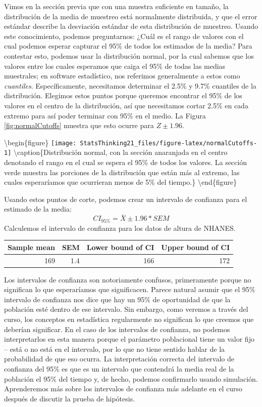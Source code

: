 \documentclass[
  12pt,
]{book}
\theoremstyle{definition}
\theoremstyle{definition}
\theoremstyle{definition}
\theoremstyle{remark}
\begin{document}
Vimos en la sección previa que con una muestra suficiente en tamaño, la distribución de la media de muestreo está normalmente distribuida, y que el error estándar describe la desviación estándar de esta distribución de muestreo. Usando este conocimiento, podemos preguntarnos: ¿Cuál es el rango de valores con el cual podemos esperar capturar el 95\% de todos los estimados de la media? Para contestar esto, podemos usar la distribución normal, por la cual sabemos que los valores entre los cuales esperamos que caiga el 95\% de todas las medias muestrales; en software estadístico, nos referimos generalmente a estos como \emph{cuantiles}. Específicamente, necesitamos determinar el 2.5\% y 9.7\% cuantiles de la distribución. Elegimos estos puntos porque queremos encontrar el 95\% de los valores en el centro de la distribución, así que necesitamos cortar 2.5\% en cada extremo para así poder terminar con 95\% en el medio. La Figura \ref{fig:normalCutoffs} muestra que esto ocurre para \(Z \pm 1.96\).

\textbackslash begin\{figure\}
\texttt{[image: StatsThinking21\_files/figure-latex/normalCutoffs-1]} \textbackslash caption\{Distribución normal, con la sección anaranjada en el centro denotando el rango en el cual se espera el 95\% de todos los valores. La sección verde muestra las porciones de la distribución que están más al extremo, las cuales esperaríamos que ocurrieran menos de 5\% del tiempo.\}\label{fig:normalCutoffs}
\textbackslash end\{figure\}

Usando estos puntos de corte, podemos crear un intervalo de confianza para el estimado de la media:
\[
CI_{95\%} = \bar{X} \pm 1.96*SEM
\]
Calculemos el intervalo de confianza para los datos de altura de NHANES.

\begin{tabular}{r|r|r|r}
\hline
Sample mean & SEM & Lower bound of CI & Upper bound of CI\\
\hline
169 & 1.4 & 166 & 172\\
\hline
\end{tabular}

Los intervalos de confianza son notoriamente confusos, primeramente porque no significan lo que esperaríamos que significacen. Parece natural asumir que el 95\% intervalo de confianza nos dice que hay un 95\% de oportunidad de que la población esté dentro de ese intervalo. Sin embargo, como veremos a través del curso, los conceptos en estadística regularmente no significan lo que creemos que deberían significar. En el caso de los intervalos de confianza, no podemos interpretarlos en esta manera porque el parámetro poblacional tiene un valor fijo -- está o no está en el intervalo, por lo que no tiene sentido hablar de la probabilidad de que eso ocurra. La interpretación correcta del intervalo de confianza del 95\% es que es un intervalo que contendrá la media real de la población el 95\% del tiempo y, de hecho, podemos confirmarlo usando simulación. Aprenderemos más sobre los intervalos de confianza más adelante en el curso después de discutir la prueba de hipótesis.
\end{document}
